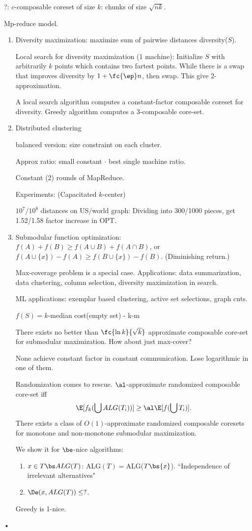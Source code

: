 ?: $c$-composable coreset of size $k$: chunks of size $\sqrt{nk}$.

Mp-reduce model.

\begin{enumerate}
\item
Diversity maximization: maximize sum of pairwise distances diversity($S$).

Local search for diversity maximization (1 machine): Initialize $S$ with arbitrarily $k$ points which contains two fartest points. While there is a swap that improves diversity by $1+\fc{\ep}n$, then swap. This give 2-approximation.

A local search algorithm computes a constant-factor composable coreset for diversity. Greedy algorithm computes  a 3-composable core-set.

\item
Distributed clustering

balanced version: size constraint on each cluster. 

Approx ratio: small constant $\cdot$ best single machine ratio.

Constant (2) rounds of MapReduce.

Experiments: (Capacitated $k$-center)

$10^7/10^8$ distances on US/world graph: Dividing into 300/1000 pieces, get 1.52/1.58 factor increase in OPT.
\item
Submodular function optimization: $f(A)+f(B)\ge f(A\cup B)+f(A\cap B)$, or $f(A\cup \{x\}) - f(A) \ge f(B\cup \{x\}) -f(B)$. (Diminishing return.)

Max-coverage problem is a special case. Applications: data summarization, data clustering, column selection, diversity maximization in search.

ML applications: exemplar based clustering, active set selections, graph cuts.

$f(S)=k$-median cost(empty set) - k-m

There exists no better than $\fc{\ln k}{\sqrt k}$ approximate composable core-set for submodular maximization. How about just max-cover?

None achieve constant factor in constant communication. Lose logarithmic in one of them. 

Randomization comes to rescue. $\al$-approximate randomized composable core-set iff
\[
\E[f_k(\bigcup ALG(T_i))] \ge \al \E[f(\bigcup T_i)].
\]
There exists a class of $O(1)$-approximate randomized composable coresets for monotone and non-monotone submodular maximization.
%

We show it for $\be$-nice algorithms: 
\begin{enumerate}
\item
$x\in T\bs ALG(T)$: ALG$(T)=$ALG($T\bs \{x\}$). ``Independence of irrelevant alternatives"
\item $\De(x,ALG(T))\le?$.
\end{enumerate}

Greedy is 1-nice.
\end{enumerate}•

